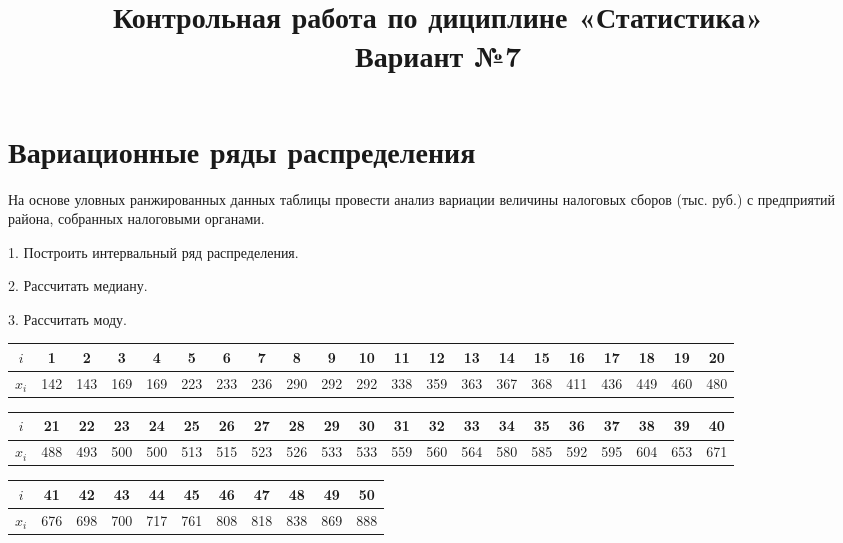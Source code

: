 \documentclass[fleqn]{article}
\title{Контрольная работа по дициплине «Статистика»\\
Вариант №7}
\begin{document}
\date{}
\maketitle
\section*{Вариационные ряды распределения}

На основе уловных ранжированных данных таблицы провести анализ вариации величины налоговых сборов (тыс. руб.) с предприятий района, собранных налоговыми органами.

1. Построить интервальный ряд распределения.

2. Рассчитать медиану.

3. Рассчитать моду.

\bgroup
\def\arraystretch{1.5}
\setlength{}
\begin{center}
\begin{tabular}{|c|c|c|c|c|c|c|c|c|c|c|c|c|c|c|c|c|c|c|c|c|}
\hline
$i$ & 1 & 2 & 3 & 4 & 5 & 6 & 7 & 8 & 9 & 10 & 11 & 12 & 13 & 14 & 15 & 16 & 17 & 18 & 19 & 20 \\
\hline
$x_i$ & 142 & 143 & 169 & 169 & 223 & 233 & 236 & 290 & 292 & 292 & 338 & 359 & 363 & 367 & 368 & 411 & 436 & 449 & 460 & 480 \\
\hline
\end{tabular}
\end{center}

\begin{center}
\begin{tabular}{|c|c|c|c|c|c|c|c|c|c|c|c|c|c|c|c|c|c|c|c|c|}
\hline
$i$ & 21 & 22 & 23 & 24 & 25 & 26 & 27 & 28 & 29 & 30 & 31 & 32 & 33 & 34 & 35 & 36 & 37 & 38 & 39 & 40 \\
\hline
$x_i$ & 488 & 493 & 500 & 500 & 513 & 515 & 523 & 526 & 533 & 533 & 559 & 560 & 564 & 580 & 585 & 592 & 595 & 604 & 653 & 671 \\
\hline
\end{tabular}
\end{center}

\begin{center}
\begin{tabular}{|c|c|c|c|c|c|c|c|c|c|c|}
\hline
$i$ & 41 & 42 & 43 & 44 & 45 & 46 & 47 & 48 & 49 & 50 \\
\hline
$x_i$ & 676 & 698 & 700 & 717 & 761 & 808 & 818 & 838 & 869 & 888 \\
\hline
\end{tabular}
\end{center}
\egroup
\end{document}
